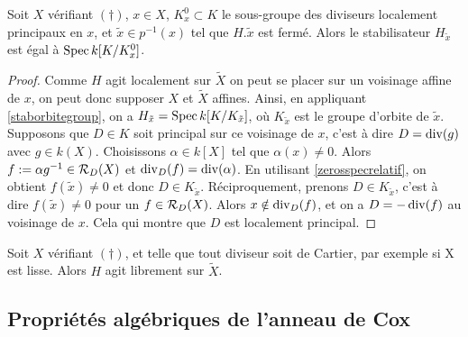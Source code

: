 \begin{cor}
Soit $X$ vérifiant $(\dagger)$, $x\in X$, $K_x^0\subset K$ le sous-groupe des diviseurs localement principaux en $x$, et $\tilde{x}\in p^{-1}(x)$ tel que $H.\tilde{x}$ est fermé. Alors le stabilisateur $H_{\tilde{x}}$ est égal à $\operatorname{Spec} k[K/K_x^0]$.
\end{cor}
\begin{proof}
Comme $H$ agit localement sur $\widetilde{X}$ on peut se placer sur un voisinage affine de $x$, on peut donc supposer $X$ et $\widetilde{X}$ affines. Ainsi, en appliquant \ref{staborbitegroup}, on a $H_{\tilde{x}}=\operatorname{Spec} k[K/K_{\tilde{x}}]$, où $K_{\tilde{x}}$ est le groupe d'orbite de $\tilde{x}$. Supposons que $D\in K$ soit principal sur ce voisinage de $x$, c'est à dire $D=\operatorname{div}(g)$ avec $g\in k(X)$. Choisissons $\alpha \in k[X]$ tel que $\alpha(x)\neq 0$. Alors $f:=\alpha g^{-1}\in \mathcal{R}_D(X)$ et $\operatorname{div}_D(f)=\operatorname{div}(\alpha)$. En utilisant \ref{zerosspecrelatif}, on obtient $f(\tilde{x})\neq 0$ et donc $D\in K_{\tilde{x}}$. Réciproquement, prenons $D\in K_{\tilde{x}}$, c'est à dire $f(\tilde{x})\neq 0$ pour un $f\in \mathcal{R}_D(X)$. Alors $x\notin \operatorname{div}_D(f)$, et on a $D=-\operatorname{div}(f)$ au voisinage de $x$. Cela qui montre que $D$ est localement principal.
\end{proof}

\begin{cor}
Soit $X$ vérifiant $(\dagger)$, et telle que tout diviseur soit de Cartier, par exemple si X est lisse. Alors $H$ agit librement sur $\widetilde{X}$.
\end{cor}


\subsection{Propriétés algébriques de l'anneau de Cox}

